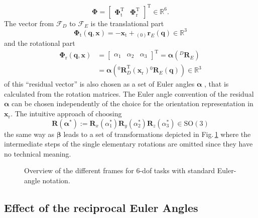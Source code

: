 \documentclass[twocolumn,10pt]{IFTOMM}
\newcommand{\bm}[1]{\boldsymbol{#1}}
\newcommand{\ortvek}[4]{{ }_{(#1)}{\boldsymbol{#2}}^{#3}_{#4} }
\newcommand{\rotmat}[2]{{{ }^{#1}\boldsymbol{R}}_{#2}}
\newcommand{\transp}[0]{{\mathrm{T}}}
\newcommand{\ks}[1]{{\mathcal{F}}_{#1}}
\begin{document}
%
\begin{equation}
\bm{\Phi}=\begin{bmatrix}
\bm{\Phi}_{\mathrm{t}}^\transp & \bm{\Phi}_{\mathrm{r}}^\transp
\end{bmatrix}^\transp \in {\mathbb{R}}^{6}.
\label{equ:Phi_def}
\end{equation}
%
The vector from $\ks{D}$ to $\ks{E}$ is the translational part 
%
\begin{equation}
\bm{\Phi}_{\mathrm{t}}(\bm{q},\bm{x}) = - \bm{x}_{\mathrm{t}} + \ortvek{0}{r}{}{E}(\bm{q}) \in {\mathbb{R}}^{3}
\label{equ:Phit_def}
\end{equation}
%
and the rotational part
%
\begin{align}
\bm{\Phi}_{\mathrm{r}}(\bm{q},\bm{x}) &= \begin{bmatrix}
\alpha_1  & \alpha_2 & \alpha_3
\end{bmatrix}^\transp
=\bm{\alpha}\left(\rotmat{D}{E}\right)\nonumber \\
&=\bm{\alpha}\left(\rotmat{0}{D}^\transp (\bm{x}_{\mathrm{r}})\rotmat{0}{E}(\bm{q})\right) \in {\mathbb{R}}^{3}
\label{equ:Phir_def}
\end{align}
%
of this ``residual vector'' is also chosen as a set of Euler angles $\bm{\alpha}$ \cite{GoldenbergBenFen1985}, that is calculated from the rotation matrices.
The Euler angle convention of the residual $\bm{\alpha}$ can be chosen independently of the choice for the orientation representation in  $\bm{x}_{\mathrm{r}}$.
The intuitive approach of choosing
%
\begin{equation}
\bm{R}(\bm{\alpha}^*) := \bm{R}_x(\alpha_1^*) \bm{R}_y(\alpha_2^*) \bm{R}_z(\alpha_3^*) \in \mathrm{SO(3)}
\label{equ:alpha_convention_xyz}
\end{equation}
%
the same way as $\bm{\beta}$ leads to a set of transformations depicted in Fig.\,\ref{fig:frames_6dof} where the intermediate steps of the single elementary rotations are omitted since they have no technical meaning.
%
\begin{figure}[tb]
    
    \vspace{-0.2cm}
    \caption{Overview of the different frames for 6-dof tasks with standard Euler-angle notation.}
    \label{fig:frames_6dof}
\end{figure} 

\subsection{Effect of the reciprocal Euler Angles}
\label{sec:RecEulAng_effect}
\end{document}

